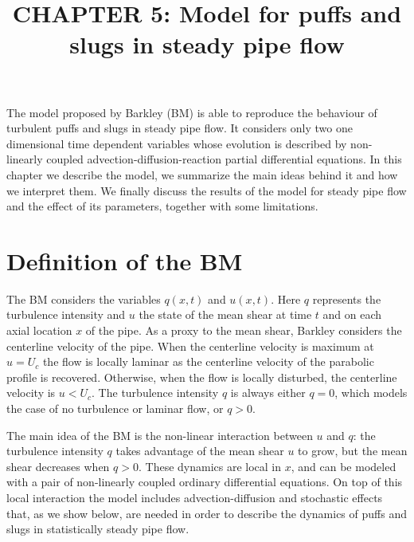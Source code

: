 \documentclass{article}
\title{CHAPTER 5: Model for puffs and slugs in steady pipe flow}
\date{}
\begin{document}
\maketitle
The model proposed by Barkley \cite{barkley2011modeling} (BM) is able to reproduce the behaviour of turbulent puffs and slugs in steady pipe flow. It considers only two one dimensional time dependent variables whose evolution is described by non-linearly coupled advection-diffusion-reaction partial differential equations. In this chapter we describe the model, we summarize the main ideas behind it and how we interpret them. We finally discuss the results of the model for steady pipe flow and the effect of its parameters, together with some limitations. 




\section{Definition of the BM}
The BM considers the variables $q\left(x,t\right)$ and $u\left(x,t\right)$. Here $q$ represents the turbulence intensity and $u$ the state of the mean shear at time $t$ and on each axial location $x$ of the pipe. As a proxy to the mean shear, Barkley considers the centerline velocity of the pipe. When the centerline velocity is maximum at $u=U_{c}$ the flow is locally laminar as the centerline velocity of the parabolic profile is recovered. Otherwise, when the flow is locally disturbed, the centerline velocity is $u < U_{c}$. The turbulence intensity $q$ is always either $q=0$, which models the case of no turbulence or laminar flow, or $q>0$. 

The main idea of the BM is the non-linear interaction between $u$ and $q$: the turbulence intensity $q$ takes advantage of the mean shear $u$ to grow, but the mean shear decreases when $q>0$. These dynamics are local in $x$, and can be modeled with a pair of non-linearly coupled ordinary differential equations. On top of this local interaction the model includes advection-diffusion and stochastic effects that, as we show below, are needed in order to describe the dynamics of puffs and slugs in statistically steady pipe flow. 
\end{document}

